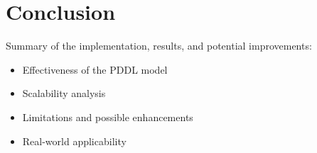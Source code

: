 \documentclass{article}
\begin{document}
\section{Conclusion}
Summary of the implementation, results, and potential improvements:
\begin{itemize}
    \item Effectiveness of the PDDL model
    \item Scalability analysis
    \item Limitations and possible enhancements
    \item Real-world applicability
\end{itemize}



\end{document}

